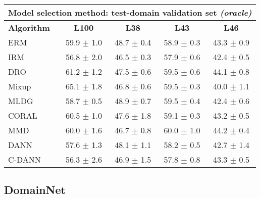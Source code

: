 \documentclass{article}
\begin{document}
\begin{center}
\begin{tabular}{lcccc}
\toprule
\multicolumn{5}{c}{\textbf{Model selection method: test-domain validation set \textit{(oracle)}}} \\
\midrule
\textbf{Algorithm}    & \textbf{L100}             & \textbf{L38}              & \textbf{L43}              & \textbf{L46}              \\
\midrule
ERM                       & 59.9 $\pm$ 1.0            & 48.7 $\pm$ 0.4            & 58.9 $\pm$ 0.3            & 43.3 $\pm$ 0.9            \\
IRM                       & 56.8 $\pm$ 2.0            & 46.5 $\pm$ 0.3            & 57.9 $\pm$ 0.6            & 42.4 $\pm$ 0.5            \\
DRO                 & 61.2 $\pm$ 1.2            & 47.5 $\pm$ 0.6            & 59.5 $\pm$ 0.6            & 44.1 $\pm$ 0.8            \\
Mixup                     & 65.1 $\pm$ 1.8            & 46.8 $\pm$ 0.6            & 59.5 $\pm$ 0.3            & 40.0 $\pm$ 1.1            \\
MLDG                      & 58.7 $\pm$ 0.5            & 48.9 $\pm$ 0.7            & 59.5 $\pm$ 0.4            & 42.4 $\pm$ 0.6            \\
CORAL                     & 60.5 $\pm$ 1.0            & 47.6 $\pm$ 1.8            & 59.1 $\pm$ 0.3            & 43.2 $\pm$ 0.5            \\
MMD                       & 60.0 $\pm$ 1.6            & 46.7 $\pm$ 0.8            & 60.0 $\pm$ 1.0            & 44.2 $\pm$ 0.4            \\
DANN                       & 57.6 $\pm$ 1.3            & 48.1 $\pm$ 1.1            & 58.2 $\pm$ 0.5            & 42.7 $\pm$ 1.4            \\
C-DANN                   & 56.3 $\pm$ 2.6            & 46.9 $\pm$ 1.5            & 57.8 $\pm$ 0.8            & 43.3 $\pm$ 0.5            \\
\bottomrule
\end{tabular}
\end{center}

\clearpage
\newpage
\subsection{DomainNet}
\end{document}

